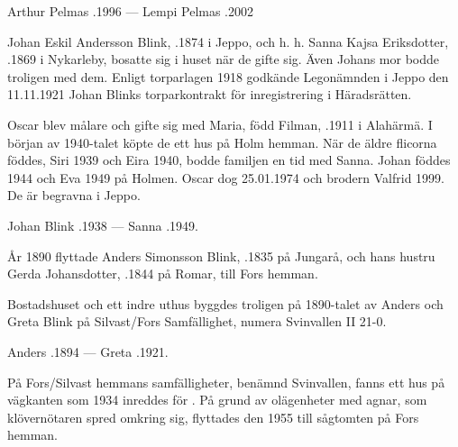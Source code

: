 Arthur Pelmas .1996  ---  Lempi Pelmas .2002


Johan Eskil Andersson Blink, .1874 i Jeppo, och h. h. Sanna Kajsa Eriksdotter, .1869 i Nykarleby, bosatte sig i huset när de gifte sig. Även Johans mor bodde troligen med dem. Enligt torparlagen 1918 godkände Legonämnden i Jeppo den 11.11.1921 Johan Blinks torparkontrakt för inregistrering i Häradsrätten.
\begin{jhchildren}
  \item {}
  \item {}
  \item {}
  \item {}
  \item {}
\end{jhchildren}
Oscar blev målare och gifte sig med Maria, född Filman, .1911 i Alahärmä. I början av 1940-talet köpte de ett hus på Holm hemman. När de äldre flicorna föddes, Siri 1939 och Eira 1940, bodde familjen en tid med Sanna. Johan föddes 1944 och Eva 1949 på Holmen. Oscar dog 25.01.1974 och brodern Valfrid 1999. De är begravna i Jeppo.

Johan Blink .1938  ---  Sanna .1949.


År 1890 flyttade Anders Simonsson Blink, .1835 på Jungarå, och hans hustru Gerda Johansdotter, .1844 på Romar, till Fors hemman.
\begin{jhchildren}
  \item {}
  \item {}
  \item {}
  \item {}
\end{jhchildren}
Bostadshuset och ett indre uthus byggdes troligen på 1890-talet av Anders och Greta Blink på Silvast/Fors Samfällighet, numera Svinvallen	II 21-0.

Anders .1894  ---  Greta .1921.


På Fors/Silvast hemmans samfälligheter, benämnd Svinvallen, fanns ett hus på vägkanten som 1934 inreddes för . På grund av olägenheter med agnar, som klövernötaren spred omkring sig, flyttades den 1955 till sågtomten på Fors hemman.
